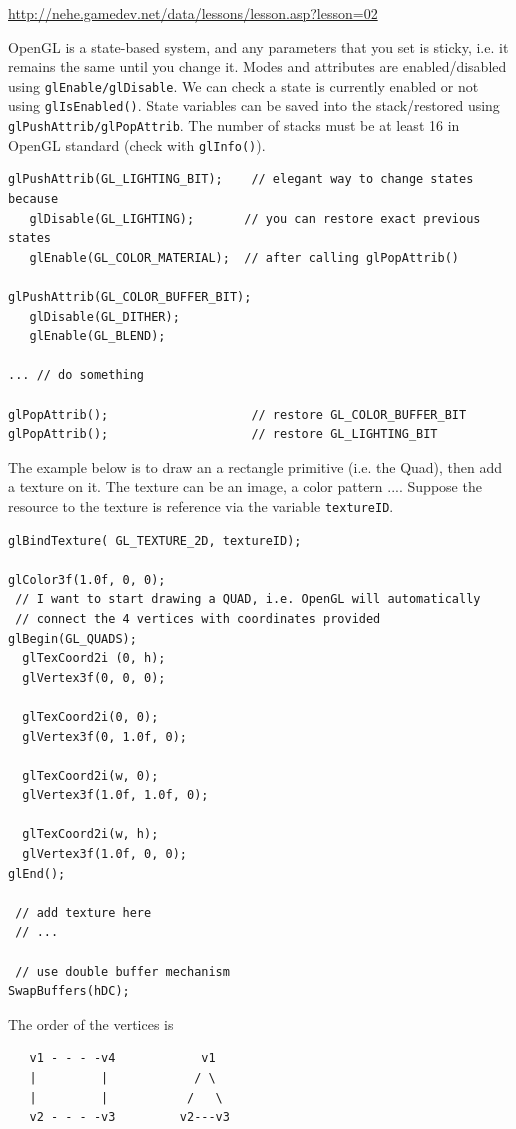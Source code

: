 \url{http://nehe.gamedev.net/data/lessons/lesson.asp?lesson=02}

OpenGL is a state-based system, and any parameters that you set is
sticky, i.e. it remains the same until you change it. Modes and
attributes are enabled/disabled using \verb!glEnable/glDisable!. We
can check a state is currently enabled or not using
\verb!glIsEnabled()!. State variables can be saved into the
stack/restored using \verb!glPushAttrib/glPopAttrib!. The number of
stacks must be at least 16 in OpenGL standard (check with
\verb!glInfo()!).
\begin{verbatim}
glPushAttrib(GL_LIGHTING_BIT);    // elegant way to change states because
   glDisable(GL_LIGHTING);       // you can restore exact previous states
   glEnable(GL_COLOR_MATERIAL);  // after calling glPopAttrib()

glPushAttrib(GL_COLOR_BUFFER_BIT);
   glDisable(GL_DITHER);
   glEnable(GL_BLEND);

... // do something

glPopAttrib();                    // restore GL_COLOR_BUFFER_BIT
glPopAttrib();                    // restore GL_LIGHTING_BIT
\end{verbatim}


The example below is to draw an a rectangle primitive (i.e. the Quad),
then add a texture on it. The texture can be an image, a color pattern
.... Suppose the resource to the texture is reference via the variable
\verb!textureID!.

\begin{lstlisting}
glBindTexture( GL_TEXTURE_2D, textureID);

glColor3f(1.0f, 0, 0);
 // I want to start drawing a QUAD, i.e. OpenGL will automatically
 // connect the 4 vertices with coordinates provided
glBegin(GL_QUADS);
  glTexCoord2i (0, h);
  glVertex3f(0, 0, 0);

  glTexCoord2i(0, 0); 
  glVertex3f(0, 1.0f, 0);
 
  glTexCoord2i(w, 0);
  glVertex3f(1.0f, 1.0f, 0);

  glTexCoord2i(w, h);
  glVertex3f(1.0f, 0, 0);
glEnd();

 // add texture here
 // ...
   
 // use double buffer mechanism
SwapBuffers(hDC);
\end{lstlisting}

The order of the vertices is
\begin{verbatim}
   v1 - - - -v4            v1
   |         |            / \
   |         |           /   \
   v2 - - - -v3         v2---v3
\end{verbatim}


